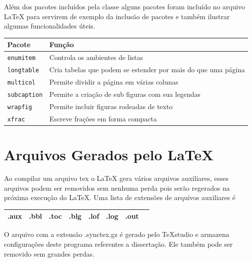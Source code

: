 \documentclass[fleqn]{profmat-cefet}
\newcommand{\TeXstudio}{\TeX\textsf{studio}}
\begin{document}
Além dos pacotes incluídos pela classe alguns pacotes foram incluído no arquivo \LaTeX{}
para servirem de exemplo da inclusão de pacotes e também ilustrar algumas funcionalidades
úteis. 
\begin{center}
    \begin{longtable}{ll}
        \hline
        Pacote                 & Função                                                        \\ \hline
        \lstinline!enumitem!   & Controla os ambientes de listas                               \\
        \lstinline!longtable!  & Cria tabelas que podem se estender por mais do que uma página \\
        \lstinline!multicol!   & Permite dividir a página em várias colunas                    \\
        \lstinline!subcaption! & Permite a criação de sub figuras com sua legendas             \\
        \lstinline!wrapfig!    & Permite incluir figuras rodeadas de texto                     \\
        \lstinline!xfrac!      & Escreve frações em forma compacta                             \\ \hline
    \end{longtable}
\end{center}

\section{Arquivos Gerados pelo \LaTeX{}}
\label{sec:arquivos_gerados_pelo_latex}

Ao compilar um arquivo \textsf{tex} o \LaTeX{} gera vários arquivos auxiliares,
esses arquivos podem ser removidos sem nenhuma perda pois serão regerados na
próxima execução do \LaTeX. Uma lista de extensões de arquivos auxiliares é
\begin{center}
    \begin{tabular}{cccccccc}    \hline
        \textsf{.aux} & \textsf{.bbl} & \textsf{.toc} &
        \textsf{.blg} & \textsf{.lof} & \textsf{.log} & 
        \textsf{.out} \\ \hline
    \end{tabular}
\end{center}

O arquivo com a extensão \textsf{.synctex.gz} é gerado pelo \TeXstudio{}
e armazena configurações deste programa referentes a dissertação. Ele também
pode ser removido sem grandes perdas.
\end{document}
